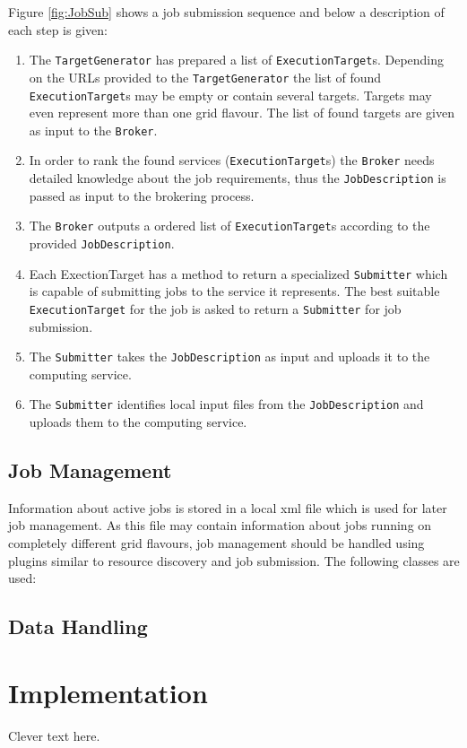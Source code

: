 \documentclass{book}
\newcommand{\TargetGenerator}{\texttt{TargetGenerator}}
\newcommand{\ExecutionTarget}{\texttt{ExecutionTarget}}
\newcommand{\Broker}{\texttt{Broker}}
\newcommand{\Submitter}{\texttt{Submitter}}
\newcommand{\JobDescription}{\texttt{JobDescription}}
\begin{document}
Figure \ref{fig:JobSub} shows a job submission sequence and below a description of each step is given:

\begin{enumerate}
\item{The {\TargetGenerator} has prepared a list of {\ExecutionTarget}s. Depending on the URLs provided to the {\TargetGenerator} the list of 
found {\ExecutionTarget}s may be empty or contain several targets. Targets may even represent more than one grid flavour. The list of 
found targets are given as input to the {\Broker}.}
\item{In order to rank the found services ({\ExecutionTarget}s) the {\Broker} needs detailed knowledge about the job requirements, thus the 
{\JobDescription} is passed as input to the brokering process.}
\item{The {\Broker} outputs a ordered list of {\ExecutionTarget}s according to the provided {\JobDescription}.}
\item{Each ExectionTarget has a method to return a specialized {\Submitter} which is capable of submitting jobs to the service it 
represents. The best suitable {\ExecutionTarget} for the job is asked to return a {\Submitter} for job submission.}
\item{The {\Submitter} takes the {\JobDescription} as input and uploads it to the computing service.}
\item{The {\Submitter} identifies local input files from the {\JobDescription} and uploads them to the computing service.}
\end{enumerate}

\section{Job Management}
Information about active jobs is stored in a local xml file which is used for later job management. As this file may contain 
information about jobs running on completely different grid flavours, job management should be handled using plugins similar to 
resource discovery and job submission. The following classes are used:

\section{Data Handling}
\label{sec:DataHandling}

\chapter{Implementation}
\label{sec:Implementation}
Clever text here.
\end{document}
